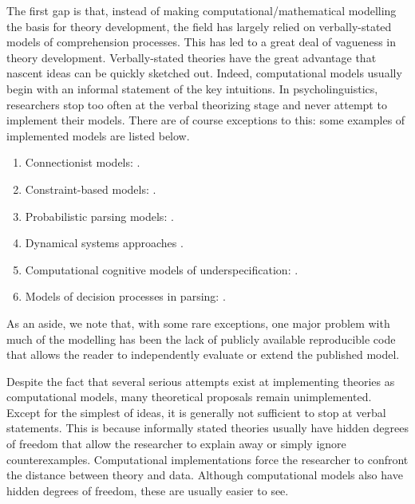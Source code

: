 \documentclass{cambridge7A}\usepackage[]{graphicx}\usepackage[]{color}
\begin{document}
 
The first gap is that, instead of making computational/mathematical
modelling the basis for theory development, the field has largely 
relied on verbally-stated models of comprehension processes. This has
led to a great deal of vagueness in theory development.
Verbally-stated theories have the great advantage that nascent ideas can be
quickly sketched out. Indeed, computational models usually begin with an
informal statement of the key intuitions. In psycholinguistics,
researchers stop too often at the verbal theorizing stage and never
attempt to implement their models. There are of course exceptions to
this: some examples of implemented models are listed below.

\begin{enumerate}
\item  {}
Connectionist models: \cite{MacDonaldChristiansen2002,Frank2009,EngelmannVasishth2009,rabovsky2014simulating,linzen2018distinct}. 
\item  {}
Constraint-based models: \cite{McRaeSpiveyKnowltonTanenhaus1998}. 
\item Probabilistic parsing models: \cite{Hale2001,Levy2008,rasmussen2017left}. 
\item  {}
Dynamical systems approaches \cite{vossekempen2000,taboretal04,cho2017incremental,SmithFranckTaborCogSci2018}. 
\item  {}
Computational cognitive models of underspecification: \cite{LogacevVasishthQJEP2016}. 
\item  {}
Models of decision processes in parsing: \cite{hammerly2019grammaticality,parker2019cue}.
\end{enumerate}

As an aside, we note that, with some rare exceptions, one major
problem with much of the modelling has been the lack of publicly
available reproducible code that allows the reader to independently
evaluate or extend the published model. 

Despite the fact that several serious attempts exist at implementing theories as computational models, many theoretical proposals remain unimplemented.
Except for the simplest of ideas, it is generally not sufficient to stop
at verbal statements. This is because informally stated theories
usually have hidden degrees of freedom that allow the researcher to
explain away or simply ignore counterexamples.  Computational
implementations force the researcher to confront the distance between
theory and data. Although computational models also have hidden
degrees of freedom, these are usually easier to see.
\end{document}
